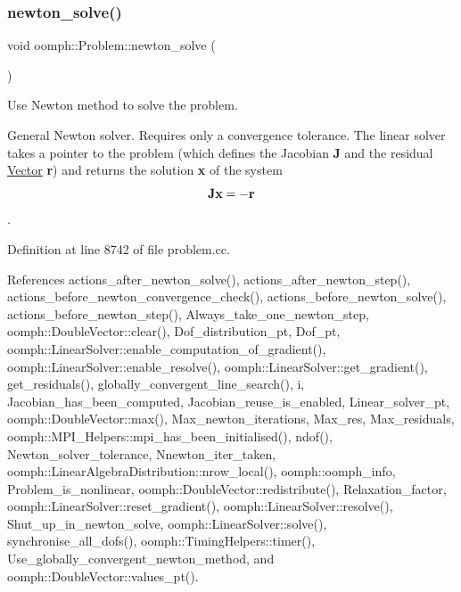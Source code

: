 \mbox{\label{classoomph_1_1Problem_a62a989ae9a9169b9d905f844db59787f}} 
\subsubsection{\texorpdfstring{newton\+\_\+solve()}{newton\_solve()}\hspace{0.1cm}{\footnotesize\ttfamily [1/2]}}
{\footnotesize\ttfamily void oomph\+::\+Problem\+::newton\+\_\+solve (\begin{DoxyParamCaption}{ }\end{DoxyParamCaption})}



Use Newton method to solve the problem. 

General Newton solver. Requires only a convergence tolerance. The linear solver takes a pointer to the problem (which defines the Jacobian {\bfseries J} and the residual \hyperlink{classoomph_1_1Vector}{Vector} {\bfseries r}) and returns the solution {\bfseries x} of the system \[ {\bf J} {\bf x} = - \bf{r} \]. 

Definition at line 8742 of file problem.\+cc.



References actions\+\_\+after\+\_\+newton\+\_\+solve(), actions\+\_\+after\+\_\+newton\+\_\+step(), actions\+\_\+before\+\_\+newton\+\_\+convergence\+\_\+check(), actions\+\_\+before\+\_\+newton\+\_\+solve(), actions\+\_\+before\+\_\+newton\+\_\+step(), Always\+\_\+take\+\_\+one\+\_\+newton\+\_\+step, oomph\+::\+Double\+Vector\+::clear(), Dof\+\_\+distribution\+\_\+pt, Dof\+\_\+pt, oomph\+::\+Linear\+Solver\+::enable\+\_\+computation\+\_\+of\+\_\+gradient(), oomph\+::\+Linear\+Solver\+::enable\+\_\+resolve(), oomph\+::\+Linear\+Solver\+::get\+\_\+gradient(), get\+\_\+residuals(), globally\+\_\+convergent\+\_\+line\+\_\+search(), i, Jacobian\+\_\+has\+\_\+been\+\_\+computed, Jacobian\+\_\+reuse\+\_\+is\+\_\+enabled, Linear\+\_\+solver\+\_\+pt, oomph\+::\+Double\+Vector\+::max(), Max\+\_\+newton\+\_\+iterations, Max\+\_\+res, Max\+\_\+residuals, oomph\+::\+M\+P\+I\+\_\+\+Helpers\+::mpi\+\_\+has\+\_\+been\+\_\+initialised(), ndof(), Newton\+\_\+solver\+\_\+tolerance, Nnewton\+\_\+iter\+\_\+taken, oomph\+::\+Linear\+Algebra\+Distribution\+::nrow\+\_\+local(), oomph\+::oomph\+\_\+info, Problem\+\_\+is\+\_\+nonlinear, oomph\+::\+Double\+Vector\+::redistribute(), Relaxation\+\_\+factor, oomph\+::\+Linear\+Solver\+::reset\+\_\+gradient(), oomph\+::\+Linear\+Solver\+::resolve(), Shut\+\_\+up\+\_\+in\+\_\+newton\+\_\+solve, oomph\+::\+Linear\+Solver\+::solve(), synchronise\+\_\+all\+\_\+dofs(), oomph\+::\+Timing\+Helpers\+::timer(), Use\+\_\+globally\+\_\+convergent\+\_\+newton\+\_\+method, and oomph\+::\+Double\+Vector\+::values\+\_\+pt().



